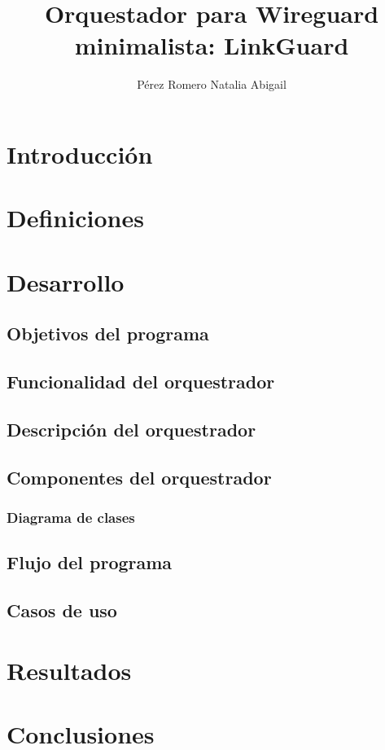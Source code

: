 \documentclass[letterpaper,12pt,oneside]{book}
\author{Pérez Romero Natalia Abigail}
\title{Orquestador para Wireguard minimalista: LinkGuard}
\begin{document}
\frontmatter
\maketitle


\mainmatter

\tableofcontents

\chapter{Introducción} %



\chapter{Definiciones}


\chapter{Desarrollo}

\section{Objetivos del programa}


\section{Funcionalidad del orquestrador}


\section{Descripción del orquestrador}


\section{Componentes del orquestrador}


\subsection{Diagrama de clases}


\section{Flujo del programa}



\section{Casos de uso}



\chapter{Resultados}  %



\chapter{Conclusiones}  %


\end{document}
